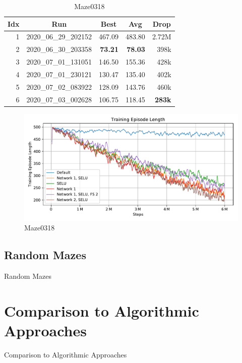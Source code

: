 \begin{table}[htp]
    \begin{center}
        \begin{tabular}{rrrrr}
            \toprule
            \multicolumn{1}{c}{Idx} & \multicolumn{1}{c}{Run} & \multicolumn{1}{c}{Best} & \multicolumn{1}{c}{Avg} & \multicolumn{1}{c}{Drop}\\
            \midrule
            1 & 2020\_06\_29\_202152 & 467.09 & 483.80 & 2.72M \\
            2 & 2020\_06\_30\_203358 & \textbf{73.21} & \textbf{78.03} & 398k \\
            3 & 2020\_07\_01\_131051 & 146.50 & 155.36 & 428k \\
            4 & 2020\_07\_01\_230121 & 130.47 & 135.40 & 402k \\
            5 & 2020\_07\_02\_083922 & 128.09 & 143.76 & 460k \\
            6 & 2020\_07\_03\_002628 & 106.75 & 118.45 & \textbf{283k} \\
            \bottomrule
        \end{tabular}
    \end{center}
    \caption{Maze0318} \label{tab:Eval/RandomGoal/Maze0318}
\end{table}

\begin{figure}[htp]
    \begin{center}
        \includegraphics[clip, width=0.95\columnwidth]{figures/evaluation/randomness/goals/maze0318_episode_length.pdf}
    \end{center}
    \caption{Maze0318} \label{fig:Eval/RandomGoal/Maze0318}
\end{figure}


\subsection{Random Mazes} \label{sec:EvalRandomMaze}
Random Mazes
\section{Comparison to Algorithmic Approaches} \label{sec:EvalAlgorithms}
Comparison to Algorithmic Approaches
